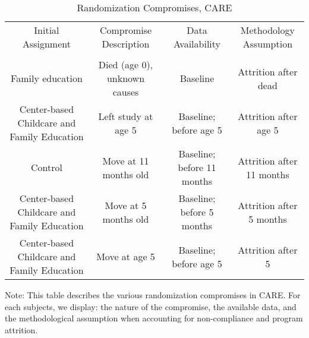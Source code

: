 \begin{sidewaystable}[H] 
\begin{threeparttable}
\caption{Randomization Compromises, CARE}
\label{table:care_compromises}
\centering
\footnotesize
\begin{tabular}{cccc} \toprule
 Initial Assignment & Compromise Description & Data Availability & Methodology Assumption \\ \\ \midrule
Family education & Died (age 0), unknown causes & Baseline & Attrition after dead \\
Center-based Childcare and Family Education  & Left study at age 5  & Baseline; before age 5 & Attrition after age 5 \\
Control & Move at 11 months old & Baseline; before 11 months & Attrition after 11 months \\
Center-based Childcare and Family Education & Move at 5 months old & Baseline; before 5 months & Attrition after 5 months \\
Center-based Childcare and Family Education & Move at age 5 & Baseline; before age 5 & Attrition after 5 \\ \bottomrule
\end{tabular}
\begin{tablenotes}
\item Note: This table describes the various randomization compromises in CARE. For each subjects, we display: the nature of the compromise, the available data, and the methodological assumption when accounting for non-compliance and program attrition. 
\end{tablenotes}
\end{threeparttable}
\end{sidewaystable}